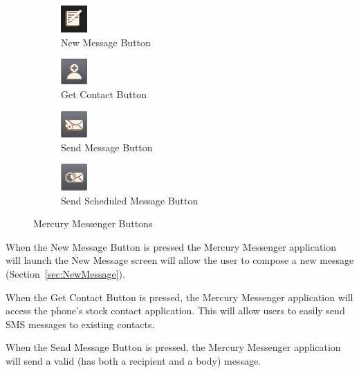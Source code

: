 \documentclass{article}
\begin{document}
\begin{figure}[h!]
\centering
	\begin{subfigure}[b]{0.25\textwidth}
		\includegraphics[width=1cm]{"./Screen_shots/New_Message_Button"}{}
		\caption{New Message Button}
	\end{subfigure} %
	\begin{subfigure}[b]{0.25\textwidth}
\includegraphics[width=1cm]{"./Screen_shots/Get_Contact_Button"}{}
\caption{Get Contact Button}
\label{fig:GetContactButton}
	\end{subfigure}
	\begin{subfigure}[b]{0.25\textwidth}
\includegraphics[width=1cm]{"./Screen_shots/Send_Message_Button"}{}
\caption{Send Message Button}
\label{fig:sendMessage}
	\end{subfigure}
\begin{subfigure}[b]{0.25\textwidth}
	\includegraphics[width=1cm]{"./Screen_shots/Send_Sched_Message_Button"}{}
	\caption{Send Scheduled Message Button}
	\label{fig:sendSchedMessage}
\end{subfigure}
	
	\caption{Mercury Messenger Buttons}

\end{figure}

\par When the New Message Button is pressed the Mercury Messenger application will launch the New Message screen  will allow the user to compose a new message (Section~\ref{sec:NewMessage}).


\par When the Get Contact Button is pressed, the Mercury Messenger application will access the phone's stock contact application. This will allow users to easily send SMS messages to existing contacts.

\par When the Send Message Button is pressed, the Mercury Messenger application will send a valid (has both a recipient and a body) message.
\end{document}
